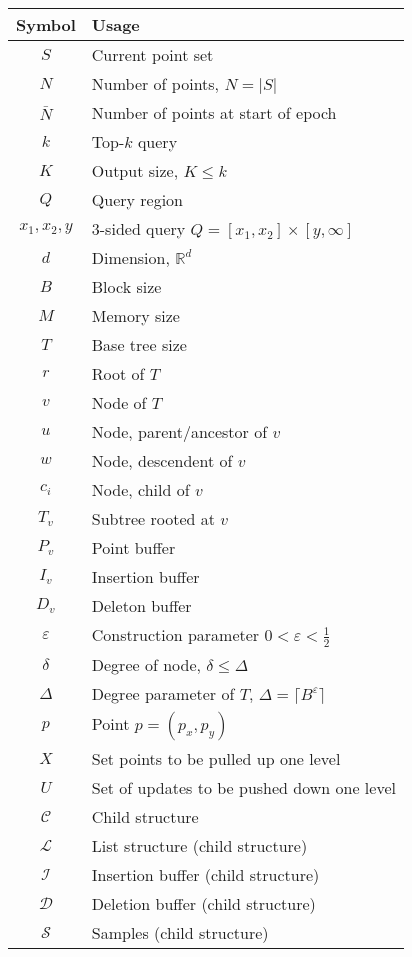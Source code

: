 \documentclass[11pt]{article}
\begin{document}
\begin{appendix}
\begin{tabular}{cl}
  Symbol & Usage \\
  \hline
  $S$ & Current point set \\
  $N$ & Number of points, $N=|S|$ \\
  $\bar{N}$ & Number of points at start of epoch \\
  $k$ & Top-$k$ query \\
  $K$ & Output size, $K\leq k$ \\
  $Q$ & Query region \\
  $x_1,x_2,y$ & 3-sided query $Q=[x_1,x_2]\times[y,\infty]$ \\
  $d$ & Dimension, $\mathbb{R}^d$ \\
  \hline
  $B$ & Block size \\
  $M$ & Memory size \\
  \hline 
  $T$ & Base tree size \\
  $r$ & Root of $T$ \\
  $v$ & Node of $T$ \\
  $u$ & Node, parent/ancestor of $v$ \\
  $w$ & Node, descendent of $v$ \\
  $c_i$ & Node, child of  $v$ \\
  $T_v$ & Subtree rooted at $v$ \\
  \hline
  $P_v$ & Point buffer \\
  $I_v$ & Insertion buffer \\
  $D_v$ & Deleton buffer \\
  $\varepsilon$ & Construction parameter $0<\varepsilon<\frac{1}{2}$ \\
  $\delta$ & Degree of node, $\delta\leq\Delta$ \\
  $\Delta$ & Degree parameter of $T$, $\Delta=\lceil B^\varepsilon\rceil$ \\
  $p$ & Point $p=(p_x,p_y)$ \\  
  $X$ & Set points to be pulled up one level \\
  $U$ & Set of updates to be pushed down one level \\
  \hline
  $\mathcal{C}$ & Child structure \\
  $\mathcal{L}$ & List structure (child structure) \\
  $\mathcal{I}$ & Insertion buffer (child structure) \\
  $\mathcal{D}$ & Deletion buffer (child structure) \\
  $\mathcal{S}$ & Samples (child structure) \\

\end{tabular}
\end{appendix}
\end{document}
